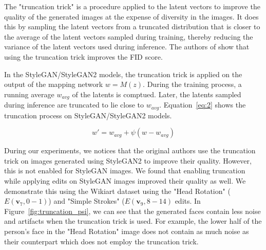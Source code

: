 The "truncation trick" is a procedure applied to the latent vectors to improve the quality of the generated images at the expense of diversity in the images. It does this by sampling the latent vectors from a truncated distribution that is closer to the average of the latent vectors sampled during training, thereby reducing the variance of the latent vectors used during inference. The authors of \cite{biggan} show that using the truncation trick improves the FID score.

In the StyleGAN/StyleGAN2 models, the truncation trick is applied on the output of the mapping network $w = M(z)$. During the training process, a running average $w_{avg}$ of the latents is comptued. Later, the latents sampled during inference are truncated to lie close to $w_{avg}$. Equation~\ref{eq:2} shows the truncation process on StyleGAN/StyleGAN2 models.

\begin{equation}
    w' = w_{avg} + \psi (w - w_{avg})
    \label{eq:2}
\end{equation}

During our experiments, we notices that the original authors use the truncation trick on images generated using StyleGAN2 to improve their quality. However, this is not enabled for StyleGAN images. We found that enabling truncation while applying edits on StyleGAN images improved their quality as well. We demonstrate this using the Wikiart dataset using the "Head Rotation" ($E(\textbf{v}_{7}, 0-1)$) and "Simple Strokes" ($E(\textbf{v}_{9}, 8-14)$ edits. In Figure~\ref{fig:truncation_psi}, we can see that the generated faces contain less noise and artifacts when the truncation trick is used. For example, the lower half of the person's face in the "Head Rotation" image does not contain as much noise as their counterpart which does not employ the truncation trick.

